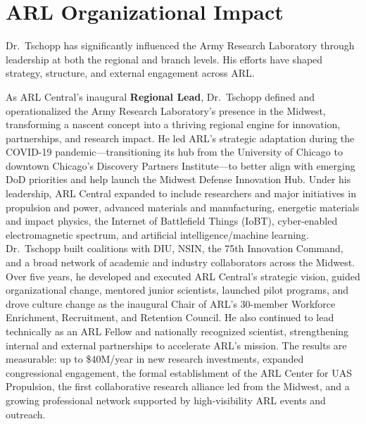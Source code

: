 \section{\sc ARL Organizational Impact} 

Dr.~Tschopp has significantly influenced the Army Research Laboratory through leadership at both the regional and branch levels. His efforts have shaped strategy, structure, and external engagement across ARL.

As ARL Central’s inaugural \textbf{Regional Lead}, Dr.~Tschopp defined and operationalized the Army Research Laboratory’s presence in the Midwest, transforming a nascent concept into a thriving regional engine for innovation, partnerships, and research impact. He led ARL’s strategic adaptation during the COVID-19 pandemic—transitioning its hub from the University of Chicago to downtown Chicago’s Discovery Partners Institute—to better align with emerging DoD priorities and help launch the Midwest Defense Innovation Hub. Under his leadership, ARL Central expanded to include researchers and major initiatives in propulsion and power, advanced materials and manufacturing, energetic materials and impact physics, the Internet of Battlefield Things (IoBT), cyber-enabled electromagnetic spectrum, and artificial intelligence/machine learning. Dr.~Tschopp built coalitions with DIU, NSIN, the 75th Innovation Command, and a broad network of academic and industry collaborators across the Midwest. Over five years, he developed and executed ARL Central’s strategic vision, guided organizational change, mentored junior scientists, launched pilot programs, and drove culture change as the inaugural Chair of ARL’s 30-member Workforce Enrichment, Recruitment, and Retention Council. He also continued to lead technically as an ARL Fellow and nationally recognized scientist, strengthening internal and external partnerships to accelerate ARL’s mission. The results are measurable: up to \$40M/year in new research investments, expanded congressional engagement, the formal establishment of the ARL Center for UAS Propulsion, the first collaborative research alliance led from the Midwest, and a growing professional network supported by high-visibility ARL events and outreach.

